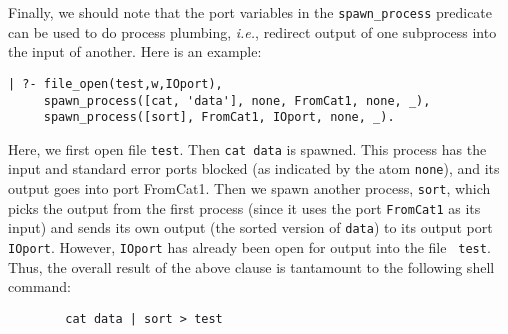 Finally, we should note that the port variables in the
\verb|spawn_process| predicate can be used to do process plumbing, {\it
  i.e.}, redirect output of one subprocess into the input of another. Here
is an example:
\begin{verbatim}
| ?- file_open(test,w,IOport),
     spawn_process([cat, 'data'], none, FromCat1, none, _),
     spawn_process([sort], FromCat1, IOport, none, _).  
\end{verbatim}
Here, we first open file {\tt test}. Then \verb|cat data| is spawned.  This
process has the input and standard error ports blocked (as indicated by the
atom {\tt none}), and its output goes into port FromCat1.  Then we spawn
another process, {\tt sort}, which picks the output from the first process
(since it uses the port {\tt FromCat1} as its input) and sends its own
output (the sorted version of {\tt data}) to its output port {\tt IOport}.
However, {\tt IOport} has already been open for output into the file {\tt
  test}. Thus, the overall result of the above clause is tantamount to the
following shell command:
\begin{verbatim}
        cat data | sort > test  
\end{verbatim}

